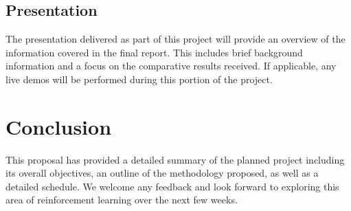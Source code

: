 \documentclass[conference]{IEEEtran}
\begin{document}
\subsection{Presentation}
The presentation delivered as part of this project will provide an overview of the information covered in the final report.
This includes brief background information and a focus on the comparative results received.
If applicable, any live demos will be performed during this portion of the project.

\section{Conclusion}
This proposal has provided a detailed summary of the planned project including its overall objectives, an outline of the methodology proposed, as well as a detailed schedule.
We welcome any feedback and look forward to exploring this area of reinforcement learning over the next few weeks.

{}


\vspace{12pt}
\end{document}
